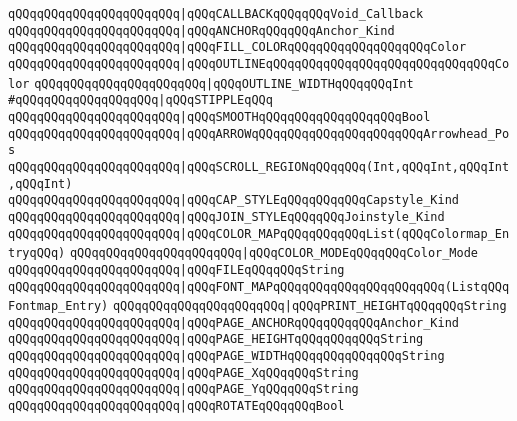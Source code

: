 \verb|qQQqqQQqqQQqqQQqqQQqqQQq|\verb#|qQQqCALLBACKqQQqqQQqVoid_Callback#\newline
\verb|qQQqqQQqqQQqqQQqqQQqqQQq|\verb#|qQQqANCHORqQQqqQQqAnchor_Kind#\newline
\verb|qQQqqQQqqQQqqQQqqQQqqQQq|\verb#|qQQqFILL_COLORqQQqqQQqqQQqqQQqqQQqColor#\newline
\verb|qQQqqQQqqQQqqQQqqQQqqQQq|\verb#|qQQqOUTLINEqQQqqQQqqQQqqQQqqQQqqQQqqQQqqQQqColor#\newline
\verb|qQQqqQQqqQQqqQQqqQQqqQQq|\verb#|qQQqOUTLINE_WIDTHqQQqqQQqInt#\newline
\verb|#qQQqqQQqqQQqqQQqqQQq|\verb#|qQQqSTIPPLEqQQq#\newline
\verb|qQQqqQQqqQQqqQQqqQQqqQQq|\verb#|qQQqSMOOTHqQQqqQQqqQQqqQQqqQQqBool#\newline
\verb|qQQqqQQqqQQqqQQqqQQqqQQq|\verb#|qQQqARROWqQQqqQQqqQQqqQQqqQQqqQQqArrowhead_Pos#\newline
\verb|qQQqqQQqqQQqqQQqqQQqqQQq|\verb#|qQQqSCROLL_REGIONqQQqqQQq(Int,qQQqInt,qQQqInt,qQQqInt)#\newline
\verb|qQQqqQQqqQQqqQQqqQQqqQQq|\verb#|qQQqCAP_STYLEqQQqqQQqqQQqCapstyle_Kind#\newline
\verb|qQQqqQQqqQQqqQQqqQQqqQQq|\verb#|qQQqJOIN_STYLEqQQqqQQqJoinstyle_Kind#\newline
\verb|qQQqqQQqqQQqqQQqqQQqqQQq|\verb#|qQQqCOLOR_MAPqQQqqQQqqQQqList(qQQqColormap_EntryqQQq)#\newline
\verb|qQQqqQQqqQQqqQQqqQQqqQQq|\verb#|qQQqCOLOR_MODEqQQqqQQqColor_Mode#\newline
\verb|qQQqqQQqqQQqqQQqqQQqqQQq|\verb#|qQQqFILEqQQqqQQqString#\newline
\verb|qQQqqQQqqQQqqQQqqQQqqQQq|\verb#|qQQqFONT_MAPqQQqqQQqqQQqqQQqqQQqqQQq(ListqQQqFontmap_Entry)#\newline
\verb|qQQqqQQqqQQqqQQqqQQqqQQq|\verb#|qQQqPRINT_HEIGHTqQQqqQQqString#\newline
\verb|qQQqqQQqqQQqqQQqqQQqqQQq|\verb#|qQQqPAGE_ANCHORqQQqqQQqqQQqAnchor_Kind#\newline
\verb|qQQqqQQqqQQqqQQqqQQqqQQq|\verb#|qQQqPAGE_HEIGHTqQQqqQQqqQQqString#\newline
\verb|qQQqqQQqqQQqqQQqqQQqqQQq|\verb#|qQQqPAGE_WIDTHqQQqqQQqqQQqqQQqString#\newline
\verb|qQQqqQQqqQQqqQQqqQQqqQQq|\verb#|qQQqPAGE_XqQQqqQQqString#\newline
\verb|qQQqqQQqqQQqqQQqqQQqqQQq|\verb#|qQQqPAGE_YqQQqqQQqString#\newline
\verb|qQQqqQQqqQQqqQQqqQQqqQQq|\verb#|qQQqROTATEqQQqqQQqBool#\newline
